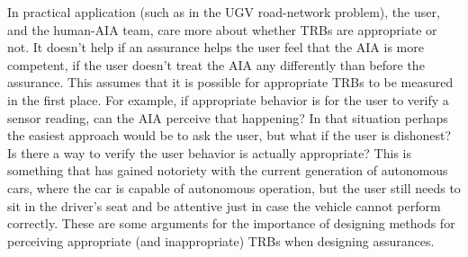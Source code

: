     In practical application (such as in the UGV road-network problem), the user, and the human-AIA team, care more about whether TRBs are appropriate or not. It doesn't help if an assurance helps the user feel that the AIA is more competent, if the user doesn't treat the AIA any differently than before the assurance. This assumes that it is possible for appropriate TRBs to be measured in the first place. For example, if appropriate behavior is for the user to verify a sensor reading, can the AIA perceive that happening? In that situation perhaps the easiest approach would be to ask the user, but what if the user is dishonest? Is there a way to verify the user behavior is actually appropriate? This is something that has gained notoriety with the current generation of autonomous cars, where the car is capable of autonomous operation, but the user still needs to sit in the driver's seat and be attentive just in case the vehicle cannot perform correctly. These are some arguments for the importance of designing methods for perceiving appropriate (and inappropriate) TRBs when designing assurances. 
%
%
%
